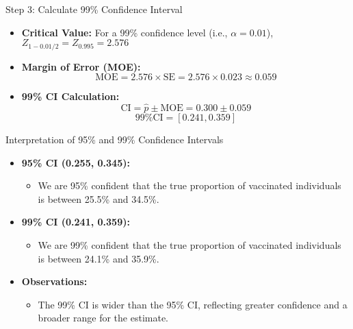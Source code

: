 \documentclass[handout]{beamer} %
\begin{document}
\begin{frame}{Step 3: Calculate 99\% Confidence Interval}
    \begin{itemize}
        \item \textbf{Critical Value:} For a 99\% confidence level (i.e., $\alpha=0.01$), \( Z_{1-0.01/2} = Z_{0.995} = 2.576 \)
        \item \textbf{Margin of Error (MOE):}
        \[
            \text{MOE} = 2.576 \times \text{SE} = 2.576 \times 0.023 \approx 0.059
        \]
        \item \textbf{99\% CI Calculation:}
        \[
            \text{CI} = \hat{p} \pm \text{MOE} = 0.300 \pm 0.059
        \]
        \[
            \text{99\% CI} = [0.241, 0.359]
        \]
    \end{itemize}
\end{frame}

\begin{frame}{Interpretation of 95\% and 99\% Confidence Intervals}
    \begin{itemize}
        \item \textbf{95\% CI (0.255, 0.345):}
        \begin{itemize}
            \item We are 95\% confident that the true proportion of vaccinated individuals is between 25.5\% and 34.5\%.
        \end{itemize}
        \item \textbf{99\% CI (0.241, 0.359):}
        \begin{itemize}
            \item We are 99\% confident that the true proportion of vaccinated individuals is between 24.1\% and 35.9\%.
        \end{itemize}
        \item \textbf{Observations:}
        \begin{itemize}
            \item The 99\% CI is wider than the 95\% CI, reflecting greater confidence and a broader range for the estimate.
        \end{itemize}
    \end{itemize}
\end{frame}
\end{document}
